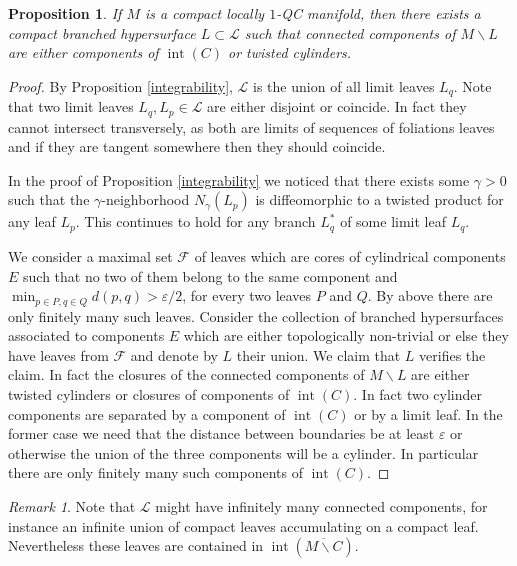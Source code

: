 \documentclass[10pt]{amsart}
\let\mathcal\mathscr
\let\moins\smallsetminus
\DeclareMathOperator{\inte}{int}
\newtheorem{proposition}[theorem]{Proposition}
\theoremstyle{definition}
\theoremstyle{remark}
\newtheorem{remark}[theorem]{Remark}
\numberwithin{equation}{section}
\begin{document}
\begin{proposition}\label{boundary}
If $M$ is a compact locally $1$-QC manifold,
then there exists a compact branched hypersurface $L\subset \mathcal L$ such that
connected components of $M\moins L$ are either components of $\inte (C)$ or twisted cylinders.
\end{proposition}
\begin{proof}
By Proposition \ref{integrability}, $\mathcal L$ is the union of all limit leaves $L_q$.
Note that two limit leaves $L_q, L_p\in \mathcal L$ are either disjoint or coincide.
In fact they cannot intersect transversely, as both are limits of sequences of
foliations leaves and if they are tangent somewhere then they should coincide.

In the proof of Proposition \ref{integrability} we noticed that there exists some $\gamma >0$
such that the $\gamma$-neighborhood $N_{\gamma}(L_p)$ is diffeomorphic to a twisted product for any
leaf $L_p$. This continues to hold for any branch $L_q^*$ of some limit leaf $L_q$.

We consider a maximal set $\mathcal F$ of leaves which are cores of cylindrical components $E$ such that
no two of them belong to the same component and $\min_{p\in P, q\in Q} d(p,q) > \varepsilon/2$, for every two
leaves $P$ and $Q$. By above there are only finitely many such leaves.
Consider the collection of branched hypersurfaces associated to components $E$ which are either topologically non-trivial
or else they have leaves from $\mathcal F$ and denote by $L$ their union.
We claim that $L$ verifies the claim. In fact the closures of the connected components of $M\moins L$ are either twisted cylinders or closures of components of $\inte (C)$. In fact two cylinder components are separated by a component of $\inte (C)$
or by a limit leaf. In the former case we need that the distance between boundaries be at least $\varepsilon$
or otherwise the union of the three components will be a cylinder. In particular there are only finitely many
such components of $\inte (C)$.
\end{proof}

\begin{remark}
Note that $\mathcal L$ might have infinitely many connected
components, for instance an infinite union of compact leaves accumulating on
a compact leaf. Nevertheless these leaves are contained in $\inte (\overline{M\moins C})$.
\end{remark}
\end{document}
